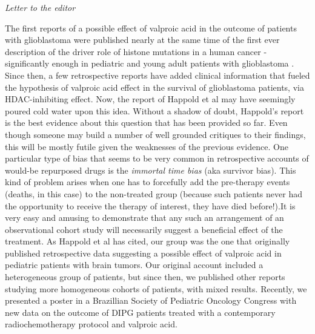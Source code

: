 \textit{Letter to the editor} 

The first reports \cite{Happold_2016} of a possible effect of valproic acid in the outcome of patients with glioblastoma were published nearly at the same time of the first ever description of the driver role of histone mutations in a human cancer - significantly enough in pediatric and young adult patients with glioblastoma \cite{Schwartzentruber_2012}. Since then, a few retrospective reports have added clinical information that fueled the hypothesis of valproic acid effect in the survival of glioblastoma patients, via HDAC-inhibiting effect. Now, the report of Happold et al \cite{Happold_2016} may have seemingly poured cold water upon this idea. Without a shadow of doubt, Happold's report is the best evidence about this question that has been provided so far. Even though someone may build a number of well grounded critiques to their findings, this will be mostly futile given the weaknesses of the previous evidence. One particular type of bias that seems to be very common in retrospective accounts of would-be repurposed drugs is the \textit{immortal time bias}\cite{Ho_2012} (aka survivor bias). This kind of problem arises when one has to forcefully add the pre-therapy events (deaths, in this case) to the non-treated group (because such patients never had the opportunity to receive the therapy of interest, they have died before!).It is very easy and amusing to demonstrate that any such an arrangement of an observational cohort study will necessarily suggest a beneficial effect of the treatment. As Happold et al has cited\cite{Happold_2016}, our group was the one that originally published retrospective data suggesting a possible effect of valproic acid in pediatric patients with brain tumors. Our original account included a heterogeneous group of patients, but since then, we published other reports studying more homogeneous cohorts of patients, with mixed results\cite{Felix_2012}. Recently, we presented a poster in a Brazillian Society of Pediatric Oncology Congress with new data on the outcome of DIPG patients treated with a contemporary radiochemotherapy protocol and valproic acid\cite{59c42273-d778-4fe5-8019-07a0e4509517}. 